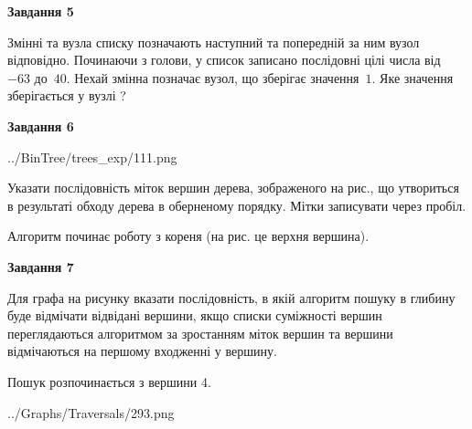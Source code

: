 \documentclass[12pt, ukrainian]{article}
\begin{document}
{\begin {large}
{\begin {center}\textbf{Завдання 5}\end {center}}\par
Змінні  та  вузла списку позначають наступний та попередній за ним вузол відповідно. Починаючи з голови, у список записано послідовні цілі числа від~$-63$ до~$40$. Нехай змінна  позначає вузол, що зберігає значення~$1$.
Яке значення зберігається у вузлі  ?\par
\newpage

{\begin {center}\textbf{Завдання 6}\end {center}}\par

\begin{center}
	{../BinTree/trees_exp/111.png}
\end{center}
Указати послідовність міток вершин дерева, зображеного на рис., що утвориться в результаті обходу дерева в оберненому порядку. Мітки записувати через пробіл.\par Алгоритм починає роботу з кореня (на рис. це верхня вершина).\par
\newpage

{\begin {center}\textbf{Завдання 7}\end {center}}\par
Для графа на рисунку вказати послідовність, в якій алгоритм пошуку в глибину буде відмічати відвідані вершини, якщо списки суміжності вершин переглядаються алгоритмом за зростанням міток вершин та вершини відмічаються на першому вход\-женні у вершину.\par
Пошук розпочинається з вершини 4.\par

\begin{center}
	{../Graphs/Traversals/293.png}
\end{center}\par
\newpage


\end{large}}
\end{document}
